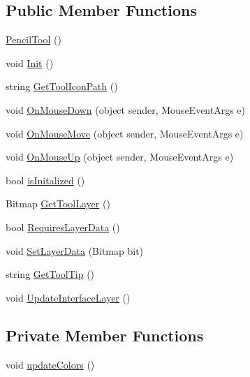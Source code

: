 \subsection*{Public Member Functions}
\begin{DoxyCompactItemize}
\item 
\mbox{\hyperlink{class_paint___program_1_1_pencil_tool_a73363f013795c8814ebf9b297ea9be29}{Pencil\+Tool}} ()
\item 
void \mbox{\hyperlink{class_paint___program_1_1_pencil_tool_ac37cf5b5ccdb57fedfa21326d795cb65}{Init}} ()
\item 
string \mbox{\hyperlink{class_paint___program_1_1_pencil_tool_a91c7f9e9bd173b3f859cbc37f44c4f48}{Get\+Tool\+Icon\+Path}} ()
\item 
void \mbox{\hyperlink{class_paint___program_1_1_pencil_tool_a559e17e6afc05dde7278d4b69b05b12d}{On\+Mouse\+Down}} (object sender, Mouse\+Event\+Args e)
\item 
void \mbox{\hyperlink{class_paint___program_1_1_pencil_tool_a05d86241cc76eaf2abaa94b6ac3f5cfe}{On\+Mouse\+Move}} (object sender, Mouse\+Event\+Args e)
\item 
void \mbox{\hyperlink{class_paint___program_1_1_pencil_tool_ad59c1709d381a33f8363fd15f526eb0e}{On\+Mouse\+Up}} (object sender, Mouse\+Event\+Args e)
\item 
bool \mbox{\hyperlink{class_paint___program_1_1_pencil_tool_abb49751775484b9fcd8ce2e20de98763}{is\+Initalized}} ()
\item 
Bitmap \mbox{\hyperlink{class_paint___program_1_1_pencil_tool_acef50de4028855c4a6be1ff9f63f9b3b}{Get\+Tool\+Layer}} ()
\item 
bool \mbox{\hyperlink{class_paint___program_1_1_pencil_tool_ae41c314454969364d7bdf85e584faf46}{Requires\+Layer\+Data}} ()
\item 
void \mbox{\hyperlink{class_paint___program_1_1_pencil_tool_a4b61261c9e375085bcbac4546a50793e}{Set\+Layer\+Data}} (Bitmap bit)
\item 
string \mbox{\hyperlink{class_paint___program_1_1_pencil_tool_a4805076bc9f2d54b48bb5e76a4e575d9}{Get\+Tool\+Tip}} ()
\item 
void \mbox{\hyperlink{class_paint___program_1_1_pencil_tool_a96ceb2ad71f16fbb361024f58665f6a3}{Update\+Interface\+Layer}} ()
\end{DoxyCompactItemize}
\subsection*{Private Member Functions}
\begin{DoxyCompactItemize}
\item 
void \mbox{\hyperlink{class_paint___program_1_1_pencil_tool_a4666e6bbf0d2716513bf12ae2a5c72f5}{update\+Colors}} ()
\end{DoxyCompactItemize}
